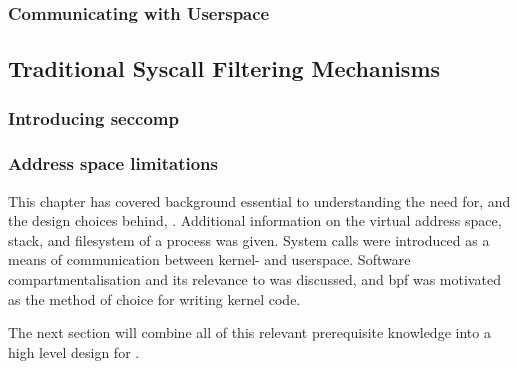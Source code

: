 \subsubsection{Communicating with Userspace}

\subsection{Traditional Syscall Filtering Mechanisms}

\subsubsection{Introducing seccomp}

\subsubsection{Address space limitations}



This chapter has covered background essential to understanding the need for, and
the design choices behind, \afss. Additional information on the
virtual address space, stack, and filesystem of a process was given. System
calls were introduced as a means of communication between kernel- and userspace.
Software compartmentalisation and its relevance to \af was
discussed, and \ac{bpf} was motivated as the method of choice for writing kernel
code. 

The next section will combine all of this relevant prerequisite knowledge into a
high level design for \afss. 
